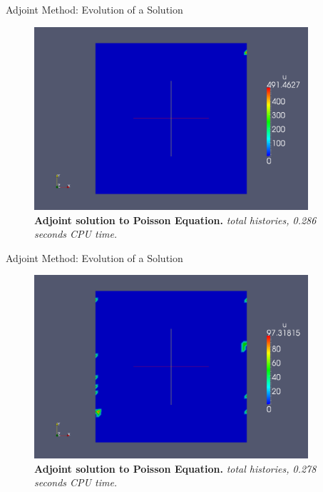 \documentclass{beamer}
\begin{document}
\begin{frame}{Adjoint Method: Evolution of a Solution}

  \begin{figure}[h!]
    \begin{center}
      \includegraphics[width=4in]{adjoint_1.png}
    \end{center}
    \caption{\textbf{Adjoint solution to Poisson Equation.}
      \textit{ total histories, 0.286 seconds CPU time.} }
  \end{figure}

\end{frame}

\begin{frame}{Adjoint Method: Evolution of a Solution}

  \begin{figure}[h!]
    \begin{center}
      \includegraphics[width=4in]{adjoint_10.png}
    \end{center}
    \caption{\textbf{Adjoint solution to Poisson Equation.}
      \textit{ total histories, 0.278 seconds CPU time.} }
  \end{figure}

\end{frame}
\end{document}
